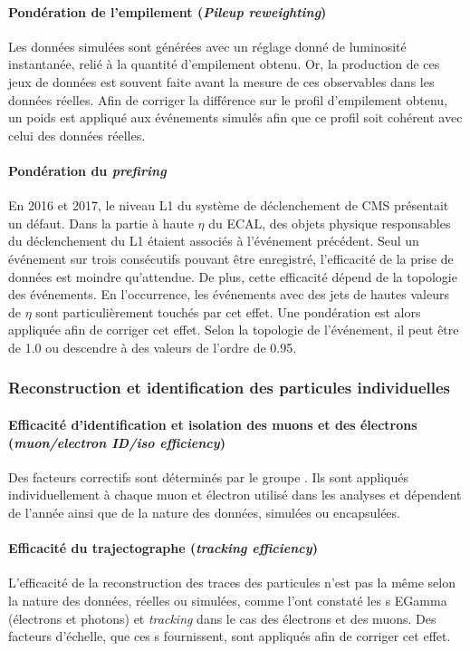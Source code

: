 \paragraph{Pondération de l'empilement (\emph{Pileup reweighting})}
Les données simulées sont générées avec un réglage donné de luminosité instantanée, relié à la quantité d'empilement obtenu.
Or, la production de ces jeux de données est souvent faite avant la mesure de ces observables dans les données réelles.
Afin de corriger la différence sur le profil d'empilement obtenu, un poids est appliqué aux événements simulés afin que ce profil soit cohérent avec celui des données réelles.
\paragraph{Pondération du \emph{prefiring}}
En 2016 et 2017, le niveau L1 du système de déclenchement de CMS présentait un défaut.
Dans la partie à haute $\eta$ du ECAL, des objets physique responsables du déclenchement du L1 étaient associés à l'événement précédent.
Seul un événement sur trois consécutifs pouvant être enregistré, l'efficacité de la prise de données est moindre qu'attendue.
De plus, cette efficacité dépend de la topologie des événements.
En l'occurrence, les événements avec des jets de hautes valeurs de $\eta$ sont particulièrement touchés par cet effet.
Une pondération est alors appliquée afin de corriger cet effet.
Selon la topologie de l'événement, il peut être de \num{1.0} ou descendre à des valeurs de l'ordre de \num{0.95}.
\subsubsection{Reconstruction et identification des particules individuelles}
\paragraph{Efficacité d'identification et isolation des muons et des électrons (\emph{muon/electron ID/iso efficiency})}
Des facteurs correctifs sont déterminés par le groupe \Higgs\tau\tau.
Ils sont appliqués individuellement à chaque muon et électron utilisé dans les analyses et dépendent de l'année ainsi que de la nature des données, simulées ou encapsulées.
\paragraph{Efficacité du trajectographe (\emph{tracking efficiency})}
L'efficacité de la reconstruction des traces des particules n'est pas la même selon la nature des données, réelles ou simulées, comme l'ont constaté les \POG s EGamma (électrons et photons) et \emph{tracking} dans le cas des électrons et des muons.
Des facteurs d'échelle, que ces \POG s fournissent, sont appliqués afin de corriger cet effet.
